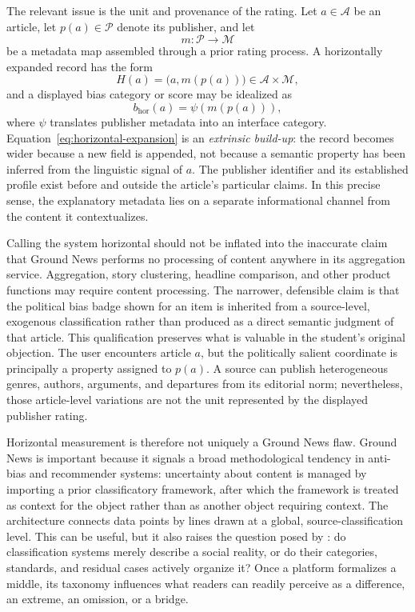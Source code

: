 The relevant issue is the unit and provenance of the rating. Let \(a\in\mathcal{A}\) be an article, let \(p(a)\in\mathcal{P}\) denote its publisher, and let
\[
    m\colon \mathcal{P}\longrightarrow\mathcal{M}
\]
be a metadata map assembled through a prior rating process. A horizontally expanded record has the form
\begin{equation}
    H(a)=\bigl(a,m(p(a))\bigr)
    \in \mathcal{A}\times\mathcal{M},
    \label{eq:horizontal-expansion}
\end{equation}
and a displayed bias category or score may be idealized as
\begin{equation}
    b_{\mathrm{hor}}(a)=\psi\!\left(m(p(a))\right),
    \label{eq:horizontal-score}
\end{equation}
where \(\psi\) translates publisher metadata into an interface category. Equation~\eqref{eq:horizontal-expansion} is an \emph{extrinsic build-up}: the record becomes wider because a new field is appended, not because a semantic property has been inferred from the linguistic signal of \(a\). The publisher identifier and its established profile exist before and outside the article's particular claims. In this precise sense, the explanatory metadata lies on a separate informational channel from the content it contextualizes.

Calling the system horizontal should not be inflated into the inaccurate claim that Ground News performs no processing of content anywhere in its aggregation service. Aggregation, story clustering, headline comparison, and other product functions may require content processing. The narrower, defensible claim is that the political bias badge shown for an item is inherited from a source-level, exogenous classification rather than produced as a direct semantic judgment of that article. This qualification preserves what is valuable in the student's original objection. The user encounters article \(a\), but the politically salient coordinate is principally a property assigned to \(p(a)\). A source can publish heterogeneous genres, authors, arguments, and departures from its editorial norm; nevertheless, those article-level variations are not the unit represented by the displayed publisher rating.

Horizontal measurement is therefore not uniquely a Ground News flaw. Ground News is important because it signals a broad methodological tendency in anti-bias and recommender systems: uncertainty about content is managed by importing a prior classificatory framework, after which the framework is treated as context for the object rather than as another object requiring context. The architecture connects data points by lines drawn at a global, source-classification level. This can be useful, but it also raises the question posed by \citet{bowkerstar1999}: do classification systems merely describe a social reality, or do their categories, standards, and residual cases actively organize it? Once a platform formalizes a middle, its taxonomy influences what readers can readily perceive as a difference, an extreme, an omission, or a bridge.


